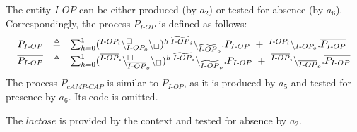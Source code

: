 The entity $I\textrm{-}OP$ can be either produced (by $a_2$) or tested for absence (by $a_6$).
Correspondingly, the process  $P_{I\textrm{-}OP}$ is defined as follows:
\[\begin{array}{lcl}
P_{I\textrm{-}OP}&\defeq & 
\sum_{h=0}^1 (\startchain{I\textrm{-}OP_i}\chainedlink{I\textrm{-}OP_o}{\noact}\chainend{\noact})^h  \, \startchain{\widetilde{I\textrm{-}OP}_i}\chainend{\widetilde{I\textrm{-}OP}_o}.P_{I\textrm{-}OP}
\  +\ %
\link{I\textrm{-}OP_i}{I\textrm{-}OP_o}.\overline{P_{I\textrm{-}OP}}\\
\overline{P_{I\textrm{-}OP}} & \defeq & 
\sum_{h=0}^1  (\startchain{\overline{I\textrm{-}OP}_i}\chainedlink{\overline{I\textrm{-}OP}_o}{\noact}\chainend{\noact})^h \,
\startchain{\widetilde{I\textrm{-}OP}_i}\chainend{\widetilde{I\textrm{-}OP}_o}.P_{I\textrm{-}OP}%
\ +\ %
\link{\overline{I\textrm{-}OP}_i}{\overline{I\textrm{-}OP}_o}.\overline{P_{I\textrm{-}OP}}\\

\end{array}
\]
\noindent
The  process $P_{cAMP\textrm{-}CAP}$ is similar to $P_{I\textrm{-}OP}$, as it is produced by $a_5$ and tested for presence by $a_6$. 
Its code is omitted.

The $lactose$ is provided by the context and tested for absence by $a_2$.


